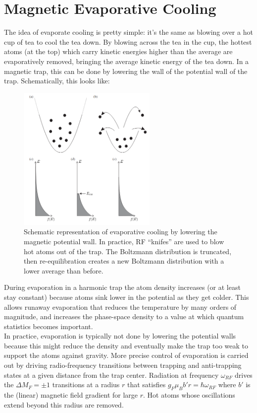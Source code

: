 \documentclass{book}
\theoremstyle{definition}
\begin{document}
\section*{Magnetic Evaporative Cooling}

The idea of evaporate cooling is pretty simple: it's the same as blowing over a hot cup of tea to cool the tea down. By blowing across the tea in the cup, the hottest atoms (at the top) which carry kinetic energies higher than the average are evaporatively removed, bringing the average kinetic energy of the tea down. In a magnetic trap, this can be done by lowering the wall of the potential wall of the trap. Schematically, this looks like:


\begin{figure}[!htb]
	\centering
	\includegraphics[width = 0.6\textwidth]{images/evap}
	\caption{Schematic representation of evaporative cooling by lowering the magnetic potential wall. In practice, RF ``knifes'' are used to blow hot atoms out of the trap. The Boltzmann distribution is truncated, then re-equilibration creates a new Boltzmann distribution with a lower average than before.}
\end{figure}


During evaporation in a harmonic trap the atom density increases (or at least stay constant) because atoms sink lower in the potential as they get colder. This allows runaway evaporation that reduces the temperature by many orders of magnitude, and increases the phase-space density to a value at which quantum statistics becomes important.\\


In practice, evaporation is typically not done by lowering the potential walls because this might reduce the density and eventually make the trap too weak to support the atoms against gravity. More precise control of evaporation is carried out by driving radio-frequency transitions between trapping and anti-trapping states at a given distance from the trap center. Radiation at frequency $\omega_{RF}$ drives the $\Delta M_F = \pm 1$ transitions at a radius $r$ that satisfies $g_F \mu_B b' r = \hbar \omega_{RF}$ where $b'$ is the (linear) magnetic field gradient for large $r$. Hot atoms whose oscillations extend beyond this radius are removed.\\
\end{document}
